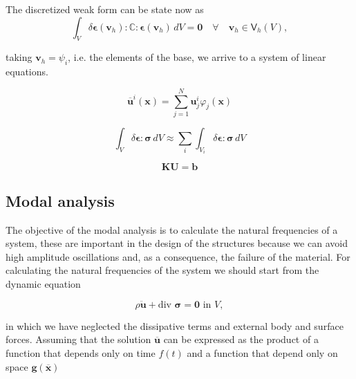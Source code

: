 \documentclass[preprint]{elsarticle}
\begin{document}

The discretized weak form can be state now as
\begin{equation}
\int_V \delta \bm{\epsilon}(\bm{v}_h) : \mathbb{C} : \bm{\epsilon}(\bm{v}_h) \,dV = \bm{0}
\quad \forall \quad \bm{v}_h \in \bm{\mathsf{V}}_h(V),
\end{equation}

\noindent
taking $\bm{v}_h = \psi_i$, i.e. the elements of the base, we
arrive to a system of linear equations.

\begin{equation}
\overline{\bm{u}}^i(\bm{x}) = 
\sum_{j=1}^N \bm{u}_j^i \varphi_j (\bm{x})
\end{equation}

\begin{equation}
\int_V \delta \bm{\epsilon}:\bm{\sigma} \,dV
\approx
\sum_i \int_{V_i} \delta \bm{\epsilon}:\bm{\sigma} \,dV
\end{equation}

\begin{equation}
\bm{K}\bm{U} = \bm{b}
\label{eq:equil_matricial}
\end{equation}


\subsection{Modal analysis}

The objective of the modal analysis is to calculate the natural frequencies
of a system, these are important in the design of the structures because we can avoid 
high amplitude oscillations and, as a consequence, the failure of the material. 
For calculating the natural frequencies of the system we should start from the
dynamic equation  

\begin{equation}
\rho \ddot{\bm{u}} + \text{div } \bm{\sigma} = \bm{0} \text{ in } V,
\label{eq:motion}
\end{equation}

\noindent
in which we have neglected the dissipative terms and external body and surface
forces.
Assuming that the solution $\overline{\bm{u}}$ can be expressed as the
product of a function that depends only on time $f(t)$ and a function that
depend only on space $\bm{g}(\overline{\bm{x}})$ 
\end{document}
